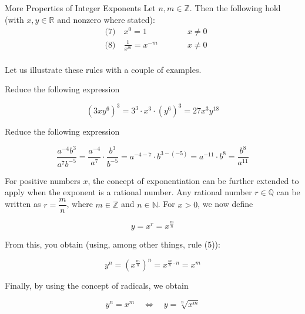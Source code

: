 \begin{proposition}{More Properties of Integer Exponents}
Let $n,m\in\mathbb{Z}$. Then the following hold (with $x,y\in\mathbb{R}$ and nonzero where stated):
\[
\begin{aligned}
&\text{(7)}\quad x^{0}=1   &\qquad&   x \neq 0  \\
&\text{(8)}\quad \frac{1}{x^{m}}=x^{-m} &\qquad& x \neq 0 \\
\end{aligned}
\]
\end{proposition}

Let us illustrate these rules with a couple of examples.

\begin{example} Reduce the following expression

    \begin{equation*}
\left(3 x y^6\right)^3=3^3 \cdot x^3 \cdot\left(y^6\right)^3=27 x^3 y^{18}
\end{equation*}
\end{example}

\begin{example} Reduce the following expression

\begin{equation*}
\frac{a^{-4} b^3}{a^7 b^{-5}}=\frac{a^{-4}}{a^7} \cdot \frac{b^3}{b^{-5}}=a^{-4-7} \cdot b^{3-(-5)}=a^{-11} \cdot b^8=\frac{b^8}{a^{11}}
\end{equation*}
\end{example}

For positive numbers \(x\), the concept of exponentiation can be further extended to apply when the exponent is a rational number. Any rational number \(r \in \mathbb{Q}\) can be written as \(r = \dfrac{m}{n}\), where \(m \in \mathbb{Z}\) and \(n \in \mathbb{N}\). For \(x > 0\), we now define

\begin{equation*}
y=x^r=x^{\frac{m}{n}}
\end{equation*}

From this, you obtain (using, among other things, rule (5)):

\[
y^n = \left(x^{\frac{m}{n}}\right)^n = x^{\frac{m}{n} \cdot n} = x^m
\]

Finally, by using the concept of radicals, we obtain

\begin{equation*}
 y^n=x^m \quad \iff \quad y=\sqrt[n]{x^m}   
\end{equation*}

